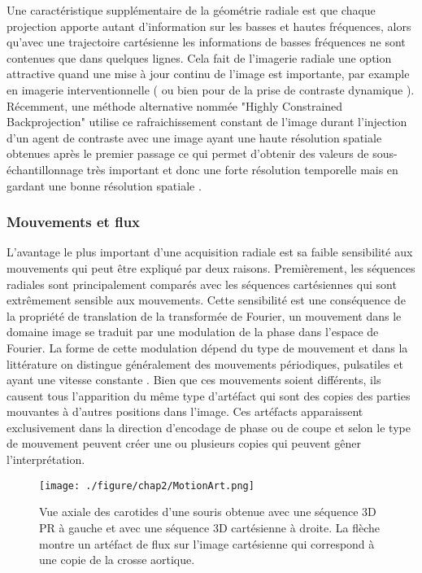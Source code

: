 Une caractéristique supplémentaire de la géométrie radiale est que chaque projection apporte autant d'information sur les basses et hautes fréquences, alors qu'avec une trajectoire cartésienne les informations de basses fréquences ne sont contenues que dans quelques lignes. Cela fait de l'imagerie radiale une option attractive quand une mise à jour continu de l'image est importante, par example en imagerie interventionnelle (\cite{Peters:2004aa} ou bien pour de la prise de contraste dynamique \cite{Prieto:2010oq}). Récemment, une méthode alternative nommée "Highly Constrained Backprojection" utilise ce rafraichissement constant de l'image durant l'injection d'un agent de contraste avec une image ayant une haute résolution spatiale obtenues après le premier passage ce qui permet d'obtenir des valeurs de sous-échantillonnage très important et donc une forte résolution temporelle mais en gardant une bonne résolution spatiale \cite{Wu:2011vn,Grist:2012fk}.

\subsubsection{Mouvements et flux}
\label{subsec:MouvEtFlux}
L'avantage le plus important d'une acquisition radiale est sa faible sensibilité aux mouvements qui peut être expliqué par deux raisons. Premièrement, les séquences radiales sont principalement comparés avec les séquences cartésiennes qui sont extrêmement sensible aux mouvements. Cette sensibilité est une conséquence de la propriété de translation de la transformée de Fourier, un mouvement dans le domaine image se traduit par une modulation de la phase dans l'espace de Fourier. La forme de cette modulation dépend du type de mouvement et dans la littérature on distingue généralement des mouvements périodiques, pulsatiles et ayant une vitesse constante \cite{Glover:1992aa}. Bien que ces mouvements soient différents, ils causent tous l'apparition du même type d'artéfact qui sont des copies des parties mouvantes à d'autres positions dans l'image. Ces artéfacts apparaissent exclusivement dans la direction d'encodage de phase ou de coupe et selon le type de mouvement peuvent créer une ou plusieurs copies qui peuvent gêner l'interprétation. 

\begin{figure}[h]
\centering
\texttt{[image: ./figure/chap2/MotionArt.png]}
\caption[Artéfact de mouvements]{\label{fig:MotionArt} Vue axiale des carotides d'une souris obtenue avec une séquence 3D PR à gauche et avec une séquence 3D cartésienne à droite. La flèche montre un artéfact de flux sur l'image cartésienne qui correspond à une copie de la crosse aortique.}
\end{figure}

